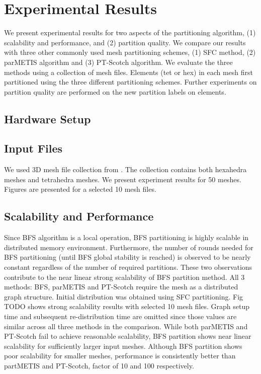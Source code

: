\documentclass[conference]{IEEEtran}
\begin{document}

\section{Experimental Results}
We present experimental results for two aspects of the partitioning algorithm, (1) scalability and performance, and (2) partition quality. We compare our results with three other commonly used mesh partitioning schemes, (1) SFC method, (2) parMETIS algorithm and (3) PT-Scotch algorithm. We evaluate the three methods using a collection of mesh files. Elements (tet or hex) in each mesh first partitioned using the three different partitioning schemes. Further experiments on partition quality are performed on the new partition labels on elements.

\subsection{Hardware Setup}

\subsection{Input Files}
We used 3D mesh file collection from \cite{meshes}. The collection contains both hexahedra meshes and tetrahedra meshes. We present experiment results for 50 meshes. Figures are presented for a selected 10 mesh files.


\subsection{Scalability and Performance}
Since BFS algorithm is a local operation, BFS partitioning is highly scalable in distributed memory environment. Furthermore, the number of rounds needed for BFS partitioning (until BFS global stability is reached) is observed to be nearly constant regardless of the number of required partitions. These two observations contribute to the near linear strong scalability of BFS partition method. All 3 methods: BFS, parMETIS and PT-Scotch require the mesh as a distributed graph structure. Initial distribution was obtained using SFC partitioning. Fig TODO shows strong scalability results with selected 10 mesh files. Graph setup time and subsequent re-distribution time are omitted since those values are similar across all three methods in the comparison. While both parMETIS and PT-Scotch fail to achieve reasonable scalability, BFS partition shows near linear scalability for sufficiently larger input meshes. Although BFS partition shows poor scalability for smaller meshes, performance is consistently better than partMETIS and PT-Scotch, factor of 10 and 100 respectively.
\end{document}
